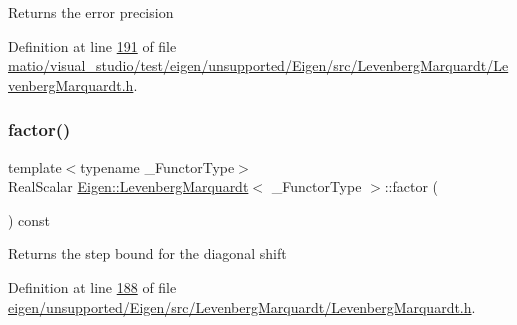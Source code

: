 \begin{DoxyReturn}{Returns}
the error precision 
\end{DoxyReturn}


Definition at line \hyperlink{matio_2visual__studio_2test_2eigen_2unsupported_2_eigen_2src_2_levenberg_marquardt_2_levenberg_marquardt_8h_source_l00191}{191} of file \hyperlink{matio_2visual__studio_2test_2eigen_2unsupported_2_eigen_2src_2_levenberg_marquardt_2_levenberg_marquardt_8h_source}{matio/visual\+\_\+studio/test/eigen/unsupported/\+Eigen/src/\+Levenberg\+Marquardt/\+Levenberg\+Marquardt.\+h}.

\mbox{\label{class_eigen_1_1_levenberg_marquardt_a282e28b8331376b9875429dab1e280ba}} 
\subsubsection{\texorpdfstring{factor()}{factor()}\hspace{0.1cm}{\footnotesize\ttfamily [1/2]}}
{\footnotesize\ttfamily template$<$typename \+\_\+\+Functor\+Type$>$ \\
Real\+Scalar \hyperlink{class_eigen_1_1_levenberg_marquardt}{Eigen\+::\+Levenberg\+Marquardt}$<$ \+\_\+\+Functor\+Type $>$\+::factor (\begin{DoxyParamCaption}{ }\end{DoxyParamCaption}) const\hspace{0.3cm}{\ttfamily [inline]}}

\begin{DoxyReturn}{Returns}
the step bound for the diagonal shift 
\end{DoxyReturn}


Definition at line \hyperlink{eigen_2unsupported_2_eigen_2src_2_levenberg_marquardt_2_levenberg_marquardt_8h_source_l00188}{188} of file \hyperlink{eigen_2unsupported_2_eigen_2src_2_levenberg_marquardt_2_levenberg_marquardt_8h_source}{eigen/unsupported/\+Eigen/src/\+Levenberg\+Marquardt/\+Levenberg\+Marquardt.\+h}.

\mbox{\label{class_eigen_1_1_levenberg_marquardt_a282e28b8331376b9875429dab1e280ba}} 
